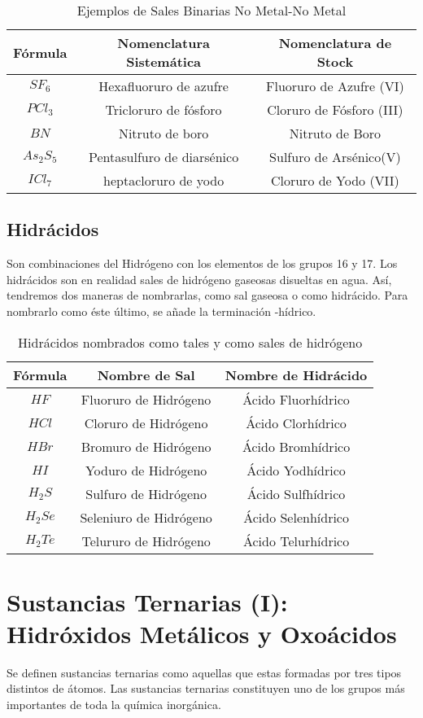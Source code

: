 \documentclass[11pt,fleqn]{book} %
\begin{document}
\begin{table}[h!]
	\centering
	\begin{tabular}{c|cc}
		Fórmula&Nomenclatura Sistemática&Nomenclatura de Stock\\ \hline
		$SF_6$&Hexafluoruro de azufre&Fluoruro de Azufre (VI)\\ 
		$PCl_{3}$&Tricloruro de fósforo&Cloruro de Fósforo (III)\\
		$BN$&Nitruto de boro&Nitruto de Boro\\
		$As_{2}S_{5}$&Pentasulfuro de diarsénico&Sulfuro de Arsénico(V)\\
		$ICl_{7}$&heptacloruro de yodo&Cloruro de Yodo (VII)\\ \hline
	\end{tabular}
	\caption{Ejemplos de Sales Binarias No Metal-No Metal}
\end{table}

\subsection{Hidrácidos}
Son combinaciones del Hidrógeno con los elementos de los grupos 16 y 17. Los hidrácidos son en realidad sales de hidrógeno gaseosas disueltas en agua. Así, tendremos dos maneras de nombrarlas, como sal gaseosa o como hidrácido. Para nombrarlo como éste último, se añade la terminación -hídrico.

\begin{table}[h!]
	\centering
	\begin{tabular}{c|cc}
		Fórmula&Nombre de Sal&Nombre de Hidrácido\\ \hline
		$HF$&Fluoruro de Hidrógeno&Ácido Fluorhídrico\\ 
		$HCl$&Cloruro de Hidrógeno&Ácido Clorhídrico\\ 
		$HBr$&Bromuro de Hidrógeno&Ácido Bromhídrico\\ 
		$HI$&Yoduro de Hidrógeno&Ácido Yodhídrico\\ 
		$H_{2}S$&Sulfuro de Hidrógeno&Ácido Sulfhídrico\\
		$H_{2}Se$&Seleniuro de Hidrógeno&Ácido Selenhídrico\\
		$H_{2}Te$&Telururo de Hidrógeno&Ácido Telurhídrico\\ \hline
	\end{tabular}
	\caption{Hidrácidos nombrados como tales y como sales de hidrógeno}
\end{table}

\section{Sustancias Ternarias (I): Hidróxidos Metálicos y Oxoácidos}
Se definen sustancias ternarias como aquellas que estas formadas por tres tipos distintos de átomos. Las sustancias ternarias constituyen uno de los grupos más importantes de toda la química inorgánica.
\end{document}

